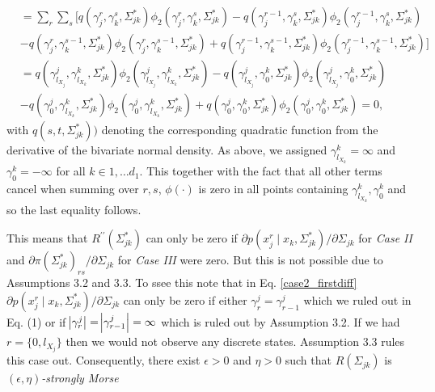 \begin{condition}
\begin{condition}
\begin{equation*}
\begin{split}
                &= \sum_r\sum_s \Big[q(\gamma_j^r, \gamma_k^s, \Sigma_{jk}^*)\phi_2(\gamma_j^r, \gamma_k^s, \Sigma_{jk}^*) - q(\gamma_j^{r-1}, \gamma_k^s, \Sigma_{jk}^*)\phi_2(\gamma_j^{r-1}, \gamma_k^s, \Sigma_{jk}^*) \\
                &- q(\gamma_j^r, \gamma_k^{s-1}, \Sigma_{jk}^*)\phi_2(\gamma_j^r, \gamma_k^{s-1}, \Sigma_{jk}^*) + q(\gamma_j^{r-1}, \gamma_k^{s-1}, \Sigma_{jk}^*)\phi_2(\gamma_j^{r-1}, \gamma_k^{s-1}, \Sigma_{jk}^*)\Big] \\
                &= q(\gamma^j_{l_{X_j}}, \gamma^k_{l_{X_k}}, \Sigma_{jk}^*)\phi_2(\gamma^j_{l_{X_j}}, \gamma^k_{l_{X_k}}, \Sigma_{jk}^*) - q(\gamma^j_{l_{X_j}}, \gamma^k_0, \Sigma_{jk}^*)\phi_2(\gamma^j_{l_{X_j}}, \gamma^k_0, \Sigma_{jk}^*) \\
                &- q(\gamma^j_0, \gamma^k_{l_{X_k}}, \Sigma_{jk}^*)\phi_2(\gamma^j_0, \gamma^k_{l_{X_k}}, \Sigma_{jk}^*) + q(\gamma^j_0, \gamma^k_0, \Sigma_{jk}^*)\phi_2(\gamma^j_0, \gamma^k_0, \Sigma_{jk}^*) = 0,
            \end{split}
        \end{equation*}
        with $q(s,t,\Sigma_{jk}^*))$ denoting the corresponding quadratic function from the derivative of the bivariate normal density. As above, we assigned $\gamma^k_{l_{X_k}} = \infty$ and $\gamma^k_0 = -\infty$ for all $k \in 1, \dots d_1$. This together with the fact that all other terms cancel when summing over $r,s$, $\phi(\cdot)$ is zero in all points containing $\gamma^k_{l_{X_k}}, \gamma^k_0$ and so the last equality follows.  
        
        This means that $R^{\prime\prime}(\Sigma_{jk}^*)$ can only be zero if $\partial p(x_j^{r} \mid x_{k}, \Sigma_{jk}^*) / \partial \Sigma_{jk}$ for \textit{Case II} and $\partial \pi(\Sigma_{jk}^*)_{rs}/\partial \Sigma_{jk}$ for \textit{Case III} were zero. But this is not possible due to Assumptions 3.2 and 3.3.
        To ssee this note that in Eq. \eqref{case2_firstdiff} $\partial p(x_j^{r} \mid x_{k}, \Sigma_{jk}^*) / \partial \Sigma_{jk}$ can only be zero if either ${\gamma}_r^j = {\gamma}_{r-1}^j$ which we ruled out in Eq. (1) 
        or if $\abs{{\gamma}_r^j} = \abs{{\gamma}_{r-1}^j} = \infty$ which is ruled out by Assumption 3.2.
        If we had $r=\{0,l_{X_j}\}$ then we would not observe any discrete states. Assumption 3.3 
        rules this case out.
        Consequently, there exist $\epsilon > 0$ and $\eta > 0$ such that $R(\Sigma_{jk})$ is $(\epsilon,\eta)$\textit{-strongly Morse}
    \end{condition}
\end{condition}


